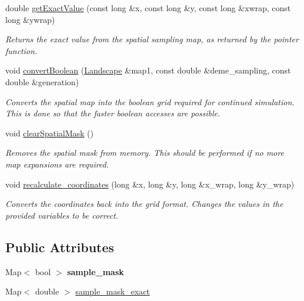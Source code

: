 \begin{DoxyCompactItemize}
double \hyperlink{class_data_mask_a2738d996bf7ee99d44a2833b2bed15ef}{get\+Exact\+Value} (const long \&x, const long \&y, const long \&xwrap, const long \&ywrap)
\begin{DoxyCompactList}\small\item\em Returns the exact value from the spatial sampling map, as returned by the pointer function. \end{DoxyCompactList}\item 
void \hyperlink{class_data_mask_a881c2393b1506d5dd026750405613bdd}{convert\+Boolean} (\hyperlink{class_landscape}{Landscape} \&map1, const double \&deme\+\_\+sampling, const double \&generation)
\begin{DoxyCompactList}\small\item\em Converts the spatial map into the boolean grid required for continued simulation. This is done so that the faster boolean accesses are possible. \end{DoxyCompactList}\item 
void \hyperlink{class_data_mask_a2d152bcb13820a9061ea85c984e042a7}{clear\+Spatial\+Mask} ()\hypertarget{class_data_mask_a2d152bcb13820a9061ea85c984e042a7}{}\label{class_data_mask_a2d152bcb13820a9061ea85c984e042a7}

\begin{DoxyCompactList}\small\item\em Removes the spatial mask from memory. This should be performed if no more map expansions are required. \end{DoxyCompactList}\item 
void \hyperlink{class_data_mask_ab96af629241f61a4d7122c6b7a91a3ef}{recalculate\+\_\+coordinates} (long \&x, long \&y, long \&x\+\_\+wrap, long \&y\+\_\+wrap)
\begin{DoxyCompactList}\small\item\em Converts the coordinates back into the grid format. Changes the values in the provided variables to be correct. \end{DoxyCompactList}\end{DoxyCompactItemize}
\subsection*{Public Attributes}
\begin{DoxyCompactItemize}
\item 
Map$<$ bool $>$ {\bfseries sample\+\_\+mask}\hypertarget{class_data_mask_a0ebe741d4b22824f93dacddd175d2c96}{}\label{class_data_mask_a0ebe741d4b22824f93dacddd175d2c96}

\item 
Map$<$ double $>$ \hyperlink{class_data_mask_acc231ebddc3e5db0103220b20d968a4f}{sample\+\_\+mask\+\_\+exact}
\end{DoxyCompactItemize}
